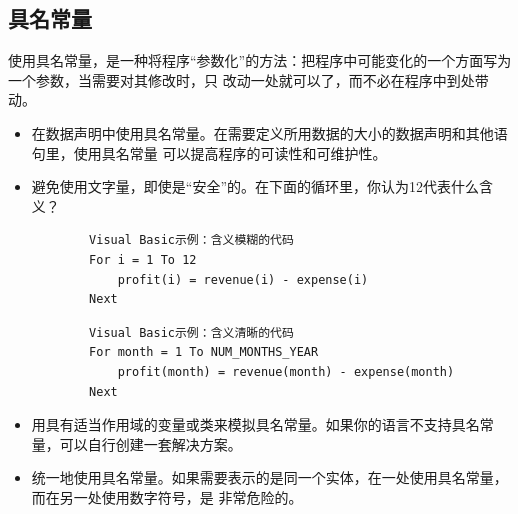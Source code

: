 \documentclass{article}
\begin{document}
\subsection{具名常量}
使用具名常量，是一种将程序“参数化”的方法：把程序中可能变化的一个方面写为一个参数，当需要对其修改时，只
改动一处就可以了，而不必在程序中到处带动。
\begin{itemize}
    \item 在数据声明中使用具名常量。在需要定义所用数据的大小的数据声明和其他语句里，使用具名常量
    可以提高程序的可读性和可维护性。
    \item 避免使用文字量，即使是“安全”的。在下面的循环里，你认为12代表什么含义？
    \begin{lstlisting}
        Visual Basic示例：含义模糊的代码
        For i = 1 To 12
            profit(i) = revenue(i) - expense(i)
        Next
    \end{lstlisting}
    \begin{lstlisting}
        Visual Basic示例：含义清晰的代码
        For month = 1 To NUM_MONTHS_YEAR
            profit(month) = revenue(month) - expense(month)
        Next
    \end{lstlisting}
    \item 用具有适当作用域的变量或类来模拟具名常量。如果你的语言不支持具名常量，可以自行创建一套解决方案。
    \item 统一地使用具名常量。如果需要表示的是同一个实体，在一处使用具名常量，而在另一处使用数字符号，是
    非常危险的。
\end{itemize}
\end{document}
